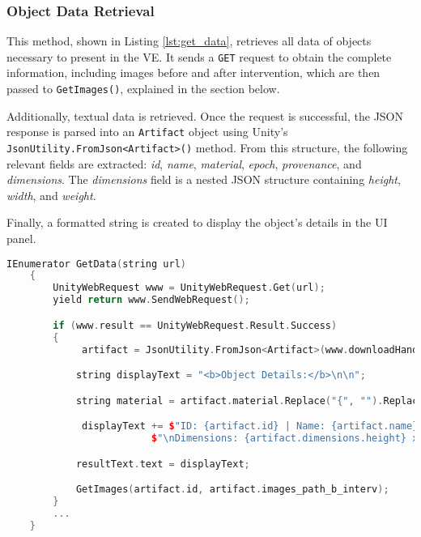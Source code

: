 \subsubsection{Object Data Retrieval}
\label{sec:data_retrieval}
This method, shown in Listing \ref{lst:get_data}, retrieves all data of objects necessary to present in the \gls{VE}.  
It sends a \texttt{GET} request to obtain the complete information, including images before and after intervention, which are then passed to \texttt{GetImages()}, explained in the section below.  

Additionally, textual data is retrieved. Once the request is successful, the JSON response is parsed into an \texttt{Artifact} object using Unity's \texttt{JsonUtility.FromJson<Artifact>()} method.  
From this structure, the following relevant fields are extracted: \emph{id}, \emph{name}, \emph{material}, \emph{epoch}, \emph{provenance}, and \emph{dimensions}.  
The \emph{dimensions} field is a nested JSON structure containing \emph{height}, \emph{width}, and \emph{weight}.  

Finally, a formatted string is created to display the object's details in the \gls{UI} panel.

\begin{lstlisting}[language=C++,label={lst:get_data}, caption={Method used to get object data from the database doing.}]
      IEnumerator GetData(string url)
    {
        UnityWebRequest www = UnityWebRequest.Get(url);
        yield return www.SendWebRequest();

        if (www.result == UnityWebRequest.Result.Success)
        {
             artifact = JsonUtility.FromJson<Artifact>(www.downloadHandler.text);

            string displayText = "<b>Object Details:</b>\n\n";

            string material = artifact.material.Replace("{", "").Replace("}", "");

             displayText += $"ID: {artifact.id} | Name: {artifact.name} \nMaterial: {material} | Epoch: {artifact.epoch} \nProvenance: {artifact.provenance}" +
                         $"\nDimensions: {artifact.dimensions.height} x {artifact.dimensions.width} cm, Weight: {Mathf.Round(artifact.dimensions.weight * 10.0f) * 0.1f} g";

            resultText.text = displayText;

            GetImages(artifact.id, artifact.images_path_b_interv);
        }
        ...
    }
\end{lstlisting}


